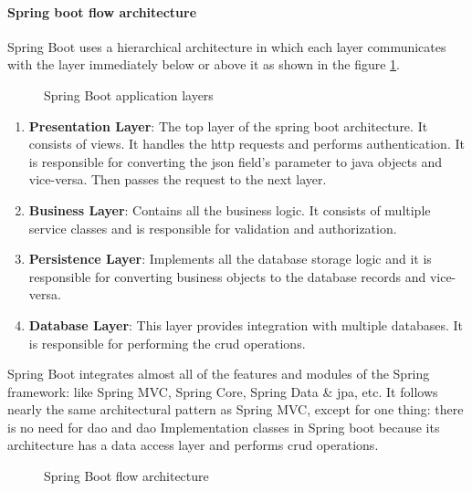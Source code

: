 \paragraph{Spring boot flow architecture} \mbox{} \newline \newline
Spring Boot uses a hierarchical architecture in which each layer communicates with the layer immediately
below or above it as shown in the figure \ref{layers}.
\begin{figure}[hbt!]
      \centering
      
      \caption{Spring Boot application layers}
      \label{layers}
\end{figure}

\begin{enumerate}
      \item \textbf{Presentation Layer}: The top layer of the spring boot architecture. It consists of views.
            It handles the \acrshort{http} requests and performs authentication. It is responsible for converting the \acrfull{json}
            field’s parameter to java objects and vice-versa. Then passes the request to the next layer.
      \item \textbf{Business Layer}: Contains all the business logic. It consists of multiple service classes
            and is responsible for validation and authorization.
      \item \textbf{Persistence Layer}: Implements all the database storage logic and it is responsible for
            converting business objects to the database records and vice-versa.
      \item \textbf{Database Layer}: This layer provides integration with multiple databases. It is
            responsible for performing the \acrshort{crud} operations.
\end{enumerate}

\noindent Spring Boot integrates almost all of the features and modules of the Spring framework: like Spring MVC,
Spring Core, Spring Data \& \acrshort{jpa}, etc. It follows nearly the same architectural pattern as
Spring MVC, except for one thing: there is no need for \acrfull{dao} and \acrshort{dao} Implementation
classes in Spring boot because its architecture has a data access layer and performs \acrshort{crud}
operations. \\


\begin{figure}[hbt!]
      \centering
      
      \caption{Spring Boot flow architecture}
      \label{flow}
\end{figure}

